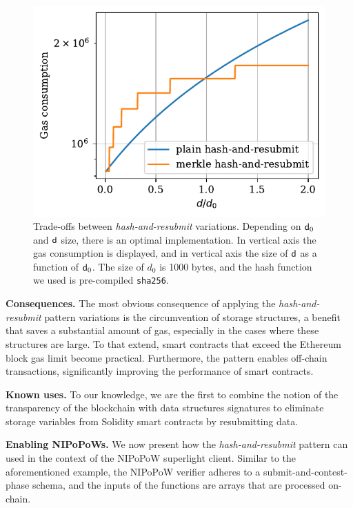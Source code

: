 \begin{figure}
    \begin{center}
        \includegraphics[width=1\columnwidth]{figures/har-vs-mhar.pdf}
    \end{center}
    \caption{Trade-offs between \emph{hash-and-resubmit} variations. Depending
    on $\mathsf{d}_0$ and $\mathsf{d}$ size, there is an optimal implementation. In
    vertical axis the gas consumption is displayed, and in vertical axis the
    size of $\mathsf{d}$ as a function of $\mathsf{d}_0$. The size of $d_0$ is 1000
    bytes, and the hash function we used is pre-compiled \texttt{sha256}.}
    \label{fig:har-vs-mhar}
\end{figure}

\noindent \textbf{Consequences.} The most obvious consequence of applying the
\emph{hash-and-resubmit} pattern variations is the circumvention of storage
structures, a benefit that saves a substantial amount of gas, especially in the
cases where these structures are large. To that extend, smart contracts that
exceed the Ethereum block gas limit become practical. Furthermore, the pattern
enables off-chain transactions, significantly improving the performance of
smart contracts.

\noindent \textbf{Known uses.} To our knowledge, we are the first to combine
the notion of the transparency of the blockchain with data structures
signatures to eliminate storage variables from Solidity smart contracts by
resubmitting data.

\noindent \textbf{Enabling NIPoPoWs.} We now present how the
\emph{hash-and-resubmit} pattern can used in the context of the NIPoPoW
superlight client. Similar to the aforementioned example, the NIPoPoW verifier
adheres to a submit-and-contest-phase schema, and the inputs of the functions
are arrays that are processed on-chain.

